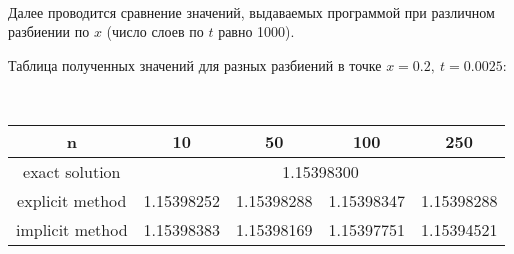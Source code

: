 \documentclass[12pt,a4paper]{article}
\begin{document}
\

Далее проводится сравнение значений, выдаваемых программой при различном разбиении по $x$ (число слоев по $t$ равно 1000).

Таблица полученных значений для разных разбиений в точке $x=0.2, \ t=0.0025$:

\

\begin{center}
\begin{tabular}{|c|c|c|c|c|}
\hline
n & 10 & 50 & 100 & 250 \\
\hline
exact solution  & \multicolumn{4}{|c|}{1.15398300} \\
\hline
explicit method & 1.15398252 & 1.15398288 & 1.15398347 & 1.15398288 \\
\hline
implicit method & 1.15398383 & 1.15398169 & 1.15397751 & 1.15394521 \\
\hline

\end{tabular}
\end{center}
\end{document}
